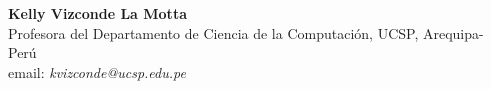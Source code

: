 \textbf{Kelly Vizconde La Motta}\\
Profesora del Departamento de Ciencia de la Computación, UCSP, Arequipa-Perú\\
email: \textit{kvizconde@ucsp.edu.pe}
